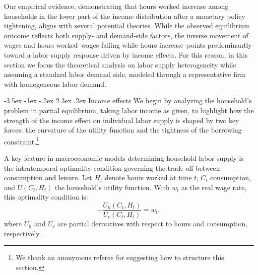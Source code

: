 \documentclass[a4paper,12pt]{article}%
\makeatletter
\renewcommand\subsection{\@startsection {subsection}{2}{\z@}%
                  {-3.5ex \@plus -1ex \@minus -.2ex}%
                  {2.3ex \@plus.2ex}%
                  {\centering\normalsize\scshape\color{black}}}
\makeatother
\begin{document}
Our empirical evidence, demonstrating that hours worked increase among households in the lower part of the income distribution after a monetary policy tightening, aligns with several potential theories. While the observed equilibrium outcome reflects both supply- and demand-side factors, the inverse movement of wages and hours worked--wages falling while hours increase--points predominantly toward a labor supply response driven by income effects. For this reason, in this section we focus the theoretical analysis on labor supply heterogeneity while assuming a standard labor demand side, modeled through a representative firm with homogeneous labor demand.





\subsection{Income effects}\label{T:Intuition}
We begin by analyzing the household's problem in partial equilibrium, taking labor income as given, to highlight how the strength of the income effect on individual labor supply is shaped by two key forces: the curvature of the utility function and the tightness of the borrowing constraint.\footnote{We thank an anonymous referee for suggesting how to structure this section.}

A key feature in macroeconomic models determining household labor supply is the intratemporal optimality condition governing the trade-off between consumption and leisure. Let \( H_t \) denote hours worked at time \( t \), \( C_t \) consumption, and \( U(C_t,H_t) \) the household's utility function. With \( w_t \) as the real wage rate, this optimality condition is:
\begin{equation}
- \frac{U_h(C_t,H_t)}{U_c(C_t,H_t)} = w_t,
\end{equation}
where \( U_h \) and \( U_c \) are partial derivatives with respect to hours and consumption, respectively.
\end{document}

